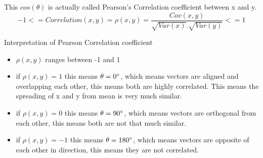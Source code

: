 \documentclass{article}
\begin{document}
This $cos(\theta)$ is actually called Pearson's Correlation coefficient between x and y.
$$
  -1<=Correlation(x,y)=\rho(x,y)=\frac{Cov(x,y)}{\sqrt{Var(x)}.\sqrt{Var(y)}}<=1
$$

\pagebreak

Interpretation of Pearson Correlation coefficient
\begin{itemize}
  \item $\rho(x,y)$ ranges between -1 and 1
  \item if $\rho(x,y)=1$ this means $\theta=0\degree$, which means vectors are aligned and overlapping each other, this means both are highly correlated. This means the spreading of x and y from mean is very much similar.
  \item if $\rho(x,y)=0$ this means $\theta=90\degree$, which means vectors are orthogonal from each other, this means both are not that much similar.
  \item if $\rho(x,y)=-1$ this means $\theta=180\degree$, which means vectors are opposite of each other in direction, this means they are not correlated.
\end{itemize}
\end{document}
